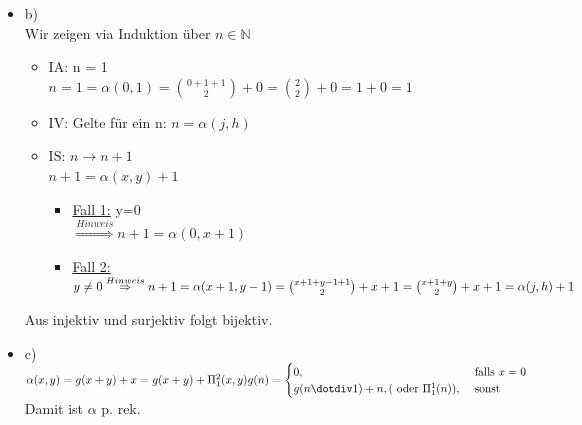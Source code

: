 \documentclass[a4paper]{scrartcl}%
\begin{document}
\begin{itemize}
        \item b)\\
            Wir zeigen via Induktion über $n \in \mathds{N}$\\
            \begin{itemize}
                \item IA: n = 1\\
                    $n = 1 = \alpha(0,1) = \binom{0+1+1}{2}+0 = \binom{2}{2}+0 = 1+0=1$\\
                \item IV: Gelte für ein n: $n = \alpha(j,h)$\\
                \item IS: $n \rightarrow n+1$\\
                    $n+1 = \alpha(x,y)+1$\\
                   \begin{itemize}
                        \item \underline{Fall 1:} y=0\\
                            $\overset{Hinweis}{\Rightarrow} n+1=\alpha(0,x+1)$
                        \item \underline{Fall 2:} $y \neq 0\\
                            \overset{Hinweis}{\Rightarrow} n+1=\alpha(x+1,y-1)\\
                            = \binom{x+1+y-1+1}{2}+x+1\\
                            = \binom{x+1+y}{2}+x+1\\
                            = \alpha(j,h) + 1$\\
                   \end{itemize} 
            \end{itemize}
            Aus injektiv und surjektiv folgt bijektiv.\\
        \item c)\\
            $\alpha(x,y) = g(x+y) + x = g(x+y) + \Pi^2_1(x,y)\\
            \\g(n) =
            \begin{cases}
                0, &\text{ falls }x=0\\
                g(n\dotdiv1) + n, (\text{ oder }\Pi^1_1(n)), &\text{ sonst }\\
            \end{cases}$\\
            Damit ist $\alpha$ p. rek.\\


\end{itemize}
\end{document}
